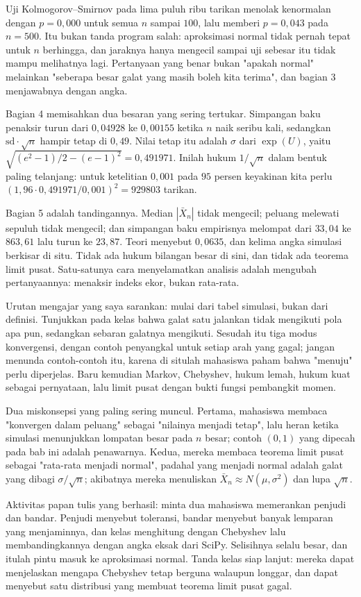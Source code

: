 Uji Kolmogorov--Smirnov pada lima puluh ribu tarikan menolak kenormalan dengan
$p=0{,}000$ untuk semua $n$ sampai $100$, lalu memberi $p=0{,}043$ pada $n=500$.
Itu bukan tanda program salah: aproksimasi normal tidak pernah tepat untuk $n$
berhingga, dan jaraknya hanya mengecil sampai uji sebesar itu tidak mampu
melihatnya lagi. Pertanyaan yang benar bukan "apakah normal" melainkan
"seberapa besar galat yang masih boleh kita terima", dan bagian 3 menjawabnya
dengan angka.

Bagian 4 memisahkan dua besaran yang sering tertukar. Simpangan baku penaksir
turun dari $0{,}04928$ ke $0{,}00155$ ketika $n$ naik seribu kali, sedangkan
$\text{sd}\cdot\sqrt n$ hampir tetap di $0{,}49$. Nilai tetap itu adalah
$\sigma$ dari $\exp(U)$, yaitu $\sqrt{(e^2-1)/2-(e-1)^2}=0{,}491971$. Inilah
hukum $1/\sqrt n$ dalam bentuk paling telanjang: untuk ketelitian $0{,}001$ pada
$95$ persen keyakinan kita perlu $(1{,}96\cdot0{,}491971/0{,}001)^2=929803$
tarikan.

Bagian 5 adalah tandingannya. Median $|\bar X_n|$ tidak mengecil; peluang
melewati sepuluh tidak mengecil; dan simpangan baku empirisnya melompat dari
$33{,}04$ ke $863{,}61$ lalu turun ke $23{,}87$. Teori menyebut $0{,}0635$, dan
kelima angka simulasi berkisar di situ. Tidak ada hukum bilangan besar di sini,
dan tidak ada teorema limit pusat. Satu-satunya cara menyelamatkan analisis adalah
mengubah pertanyaannya: menaksir indeks ekor, bukan rata-rata.

\begin{untukdosen}
Urutan mengajar yang saya sarankan: mulai dari tabel simulasi, bukan dari definisi.
Tunjukkan pada kelas bahwa galat satu jalankan tidak mengikuti pola apa pun,
sedangkan sebaran galatnya mengikuti. Sesudah itu tiga modus konvergensi, dengan
contoh penyangkal untuk setiap arah yang gagal; jangan menunda contoh-contoh itu,
karena di situlah mahasiswa paham bahwa "menuju" perlu diperjelas. Baru kemudian
Markov, Chebyshev, hukum lemah, hukum kuat sebagai pernyataan, lalu limit pusat
dengan bukti fungsi pembangkit momen.

Dua miskonsepsi yang paling sering muncul. Pertama, mahasiswa membaca "konvergen
dalam peluang" sebagai "nilainya menjadi tetap", lalu heran ketika simulasi
menunjukkan lompatan besar pada $n$ besar; contoh $(0,1)$ yang dipecah pada bab
ini adalah penawarnya. Kedua, mereka membaca teorema limit pusat sebagai "rata-rata
menjadi normal", padahal yang menjadi normal adalah galat yang dibagi
$\sigma/\sqrt n$; akibatnya mereka menuliskan $\bar X_n\approx N(\mu,\sigma^2)$
dan lupa $\sqrt n$.

Aktivitas papan tulis yang berhasil: minta dua mahasiswa memerankan penjudi dan
bandar. Penjudi menyebut toleransi, bandar menyebut banyak lemparan yang
menjaminnya, dan kelas menghitung dengan Chebyshev lalu membandingkannya dengan
angka eksak dari SciPy. Selisihnya selalu besar, dan itulah pintu masuk ke
aproksimasi normal. Tanda kelas siap lanjut: mereka dapat menjelaskan mengapa
Chebyshev tetap berguna walaupun longgar, dan dapat menyebut satu distribusi yang
membuat teorema limit pusat gagal.
\end{untukdosen}

